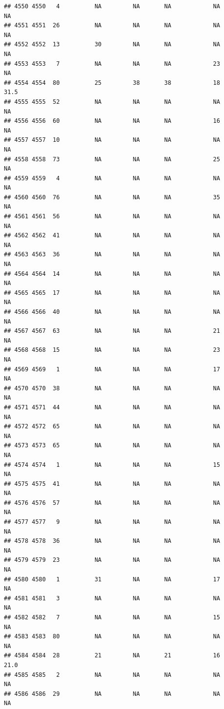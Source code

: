 \documentclass[man]{apa6}
\begin{document}
\begin{verbatim}
## 4550 4550   4          NA         NA       NA            NA       NA
## 4551 4551  26          NA         NA       NA            NA       NA
## 4552 4552  13          30         NA       NA            NA       NA
## 4553 4553   7          NA         NA       NA            23       NA
## 4554 4554  80          25         38       38            18     31.5
## 4555 4555  52          NA         NA       NA            NA       NA
## 4556 4556  60          NA         NA       NA            16       NA
## 4557 4557  10          NA         NA       NA            NA       NA
## 4558 4558  73          NA         NA       NA            25       NA
## 4559 4559   4          NA         NA       NA            NA       NA
## 4560 4560  76          NA         NA       NA            35       NA
## 4561 4561  56          NA         NA       NA            NA       NA
## 4562 4562  41          NA         NA       NA            NA       NA
## 4563 4563  36          NA         NA       NA            NA       NA
## 4564 4564  14          NA         NA       NA            NA       NA
## 4565 4565  17          NA         NA       NA            NA       NA
## 4566 4566  40          NA         NA       NA            NA       NA
## 4567 4567  63          NA         NA       NA            21       NA
## 4568 4568  15          NA         NA       NA            23       NA
## 4569 4569   1          NA         NA       NA            17       NA
## 4570 4570  38          NA         NA       NA            NA       NA
## 4571 4571  44          NA         NA       NA            NA       NA
## 4572 4572  65          NA         NA       NA            NA       NA
## 4573 4573  65          NA         NA       NA            NA       NA
## 4574 4574   1          NA         NA       NA            15       NA
## 4575 4575  41          NA         NA       NA            NA       NA
## 4576 4576  57          NA         NA       NA            NA       NA
## 4577 4577   9          NA         NA       NA            NA       NA
## 4578 4578  36          NA         NA       NA            NA       NA
## 4579 4579  23          NA         NA       NA            NA       NA
## 4580 4580   1          31         NA       NA            17       NA
## 4581 4581   3          NA         NA       NA            NA       NA
## 4582 4582   7          NA         NA       NA            15       NA
## 4583 4583  80          NA         NA       NA            NA       NA
## 4584 4584  28          21         NA       21            16     21.0
## 4585 4585   2          NA         NA       NA            NA       NA
## 4586 4586  29          NA         NA       NA            NA       NA

\end{verbatim}
\end{document}

